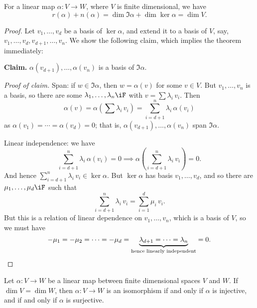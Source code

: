 \begin{theorem}
	 For a linear map $\alpha:V\to W$, where $V$ is finite dimensional, we have %
	\begin{equation*}
		r(\alpha) + n(\alpha) = \dim \Im \alpha + \dim \ker \alpha = \dim V.
	\end{equation*}
\end{theorem}

\begin{proof}
	Let $v_1,\ldots,v_d$ be a basis of $\ker\alpha$, and extend it to a basis of $V$, say, $v_1,\ldots,v_d,v_{d+1},\ldots,v_n$. We show the following claim, which implies the theorem immediately: %
	
	\textbf{Claim.} $\alpha(v_{d+1}),\ldots,\alpha(v_n)$ is a basis of $\Im\alpha$. %
	
	\emph{Proof of claim.} Span: if $w\in\Im\alpha$, then $w=\alpha(v)$ for some $v\in V$. But $v_1,\ldots,v_n$ is a basis, so there are some $\lambda_1,\ldots,\lambda_n\iF$ with $v=\sum \lambda_i \,v_i$. Then %
	\begin{equation*}
		\alpha(v)
		= \alpha\left( \sum \lambda_i \, v_i \right)
		= \sum_{i=d+1}^n \lambda_i \, \alpha(v_i)
	\end{equation*}
	as $\alpha(v_1)=\cdots=\alpha(v_d)=0$; that is, $\alpha(v_{d+1}),\ldots,\alpha(v_n)$ span $\Im\alpha$. %
	
	Linear independence: we have
	\begin{equation*}
		\sum_{i=d+1}^n \lambda_i\,\alpha(v_i) = 0
		\implies
		\alpha\left( \sum_{i=d+1}^n \lambda_i \, v_i \right) = 0.
	\end{equation*}
	And hence $\sum_{i=d+1}^n \lambda_i\,v_i \in \ker\alpha$. But $\ker\alpha$ has basis $v_1,\ldots,v_d$, and so there are $\mu_1,\ldots,\mu_d\iF$ such that %
	\begin{equation*}
		\sum_{i=d+1}^n \lambda_i\,v_i = \sum_{i=1}^d \mu_i\,v_i.
	\end{equation*}
	But this is a relation of linear dependence on $v_1,\ldots,v_n$, which is a basis of $V$, so we must have %
	\begin{equation*}
		-\mu_1 = -\mu_2 = \cdots = -\mu_d = \underbrace{\lambda_{d+1} = \cdots = \lambda_n}_\text{hence linearly independent} = 0. \qedhere %
	\end{equation*}
\end{proof}

\begin{corollary}
	Let $\alpha:V\to W$ be a linear map between finite dimensional spaces $V$ and $W$. If $\dim V=\dim W$, then $\alpha:V\to W$ is an isomorphism if and only if $\alpha$ is injective, and if and only if $\alpha$ is surjective. %
\end{corollary}

